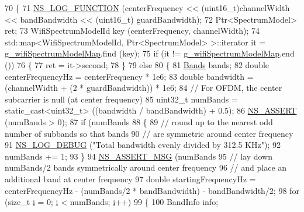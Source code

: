\begin{DoxyCode}
70 \{
71   \hyperlink{log-macros-disabled_8h_a90b90d5bad1f39cb1b64923ea94c0761}{NS\_LOG\_FUNCTION} (centerFrequency << (uint16\_t)channelWidth << bandBandwidth << (uint16\_t)
      guardBandwidth);
72   Ptr<SpectrumModel> ret;
73   WifiSpectrumModelId key (centerFrequency, channelWidth);
74   std::map<WifiSpectrumModelId, Ptr<SpectrumModel> >::iterator it = 
      \hyperlink{namespacens3_a973157d1ac2cfc5e6b3d60be8a7d721d}{g\_wifiSpectrumModelMap}.find (key);
75   \textcolor{keywordflow}{if} (it != \hyperlink{namespacens3_a973157d1ac2cfc5e6b3d60be8a7d721d}{g\_wifiSpectrumModelMap}.end ())
76     \{
77       ret = it->second;
78     \}
79   \textcolor{keywordflow}{else}
80     \{
81       \hyperlink{namespacens3_a46ac9188e5cf43bd5292f7b67451246e}{Bands} bands;
82       \textcolor{keywordtype}{double} centerFrequencyHz = centerFrequency * 1e6;
83       \textcolor{keywordtype}{double} bandwidth = (channelWidth + (2 * guardBandwidth)) * 1e6;
84       \textcolor{comment}{// For OFDM, the center subcarrier is null (at center frequency)}
85       uint32\_t numBands = \textcolor{keyword}{static\_cast<}uint32\_t\textcolor{keyword}{>} ((bandwidth / bandBandwidth) + 0.5);
86       \hyperlink{assert_8h_a6dccdb0de9b252f60088ce281c49d052}{NS\_ASSERT} (numBands > 0);
87       \textcolor{keywordflow}{if} (numBands %
88         \{
89           \textcolor{comment}{// round up to the nearest odd number of subbands so that bands}
90           \textcolor{comment}{// are symmetric around center frequency}
91           \hyperlink{group__logging_ga413f1886406d49f59a6a0a89b77b4d0a}{NS\_LOG\_DEBUG} (\textcolor{stringliteral}{"Total bandwidth evenly divided by 312.5 KHz"});
92           numBands += 1;    
93         \}
94       \hyperlink{assert_8h_aff5ece9066c74e681e74999856f08539}{NS\_ASSERT\_MSG} (numBands %
95       \textcolor{comment}{// lay down numBands/2 bands symmetrically around center frequency}
96       \textcolor{comment}{// and place an additional band at center frequency}
97       \textcolor{keywordtype}{double} startingFrequencyHz = centerFrequencyHz - (numBands/2 * bandBandwidth) - bandBandwidth/2;
98       \textcolor{keywordflow}{for} (\textcolor{keywordtype}{size\_t} \hyperlink{bernuolliDistribution_8m_a6f6ccfcf58b31cb6412107d9d5281426}{i} = 0; \hyperlink{bernuolliDistribution_8m_a6f6ccfcf58b31cb6412107d9d5281426}{i} < numBands; \hyperlink{bernuolliDistribution_8m_a6f6ccfcf58b31cb6412107d9d5281426}{i}++) 
99         \{
100           BandInfo info;

\end{DoxyCode}
